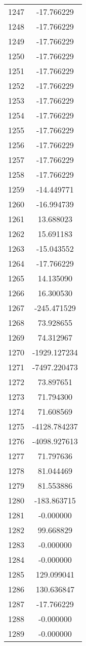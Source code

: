 \documentclass[12pt]{article}
\begin{document}
\begin{longtable}{@{}cc@{}}
1247 & -17.766229 \\
1248 & -17.766229 \\
1249 & -17.766229 \\
1250 & -17.766229 \\
1251 & -17.766229 \\
1252 & -17.766229 \\
1253 & -17.766229 \\
1254 & -17.766229 \\
1255 & -17.766229 \\
1256 & -17.766229 \\
1257 & -17.766229 \\
1258 & -17.766229 \\
1259 & -14.449771 \\
1260 & -16.994739 \\
1261 & 13.688023 \\
1262 & 15.691183 \\
1263 & -15.043552 \\
1264 & -17.766229 \\
1265 & 14.135090 \\
1266 & 16.300530 \\
1267 & -245.471529 \\
1268 & 73.928655 \\
1269 & 74.312967 \\
1270 & -1929.127234 \\
1271 & -7497.220473 \\
1272 & 73.897651 \\
1273 & 71.794300 \\
1274 & 71.608569 \\
1275 & -4128.784237 \\
1276 & -4098.927613 \\
1277 & 71.797636 \\
1278 & 81.044469 \\
1279 & 81.553886 \\
1280 & -183.863715 \\
1281 & -0.000000 \\
1282 & 99.668829 \\
1283 & -0.000000 \\
1284 & -0.000000 \\
1285 & 129.099041 \\
1286 & 130.636847 \\
1287 & -17.766229 \\
1288 & -0.000000 \\
1289 & -0.000000 \\

\end{longtable}
\end{document}
